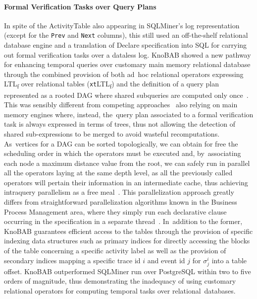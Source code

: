 \documentclass[information,article,accept,pdftex,oneauthor]{Definitions/mdpi}
\begin{document}
\paragraph{Formal Verification Tasks over Query Plans} In spite of the ActivityTable also appearing in SQLMiner's log representation~\cite{DBLP:conf/caise/SchonigRCJM16} (except for the \texttt{Prev} and \texttt{Next} columns), this still used an off-the-shelf relational database engine and a translation of Declare specification into SQL for carrying out formal verification tasks over a dataless log. KnoBAB showed a new pathway for enhancing temporal queries over customary main memory relational database through the combined provision of both ad~hoc  relational operators expressing LTL\textsubscript{f} over relational tables (\texttt{xt}LTL\textsubscript{f}) and the definition of a query plan represented as a rooted DAG where shared subqueries are computed only once~\cite{BellatrecheKB21}. This was sensibly different from competing approaches~\cite{DBLP:books/sp/22/MurillasRA22,DBLP:books/sp/22/KammererPR22} also relying on main memory engines where, instead, the~query plan associated to a formal verification task is always expressed in terms of trees, thus not allowing the detection of shared sub-expressions to be merged to avoid wasteful recomputations. As~vertices for a DAG can be sorted topologically, we can obtain for free the scheduling order in which the operators must be executed and, by~associating each node a maximum distance value from the root, we can safely run in parallel all the operators laying at the same depth level, as all the previously called operators will pertain their information in an intermediate cache, thus achieving intraquery parallelism as a free meal~\cite{info14030173}. This parallelization approach greatly differs from straightforward parallelization algorithms known in the Business Process Management area, where they simply run each declarative clause occurring in the specification in a separate thread~\cite{BurattinMS16}. In~addition to the former, KnoBAB guarantees efficient access to the tables through the provision of specific indexing data structures such as primary indices for directly accessing the blocks of the table concerning a specific activity label as well as the provision of secondary indices mapping a specific trace id $i$ and event id $j$ for $\sigma^i_j$ into a table offset. KnoBAB outperformed SQLMiner run over PostgreSQL within two to five orders of magnitude, thus demonstrating the inadequacy of using customary relational operators for computing temporal tasks over relational~databases. 
\end{document}
